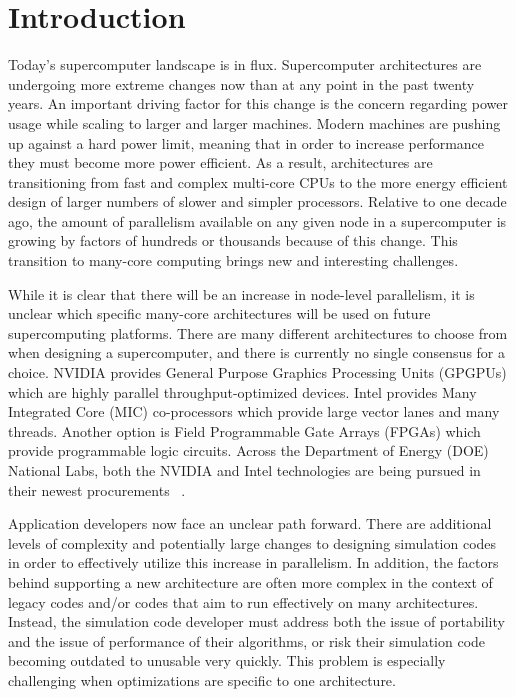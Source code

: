 \section{ \textbf{Introduction}}

Today's supercomputer landscape is in flux.
%
Supercomputer architectures are undergoing more extreme changes now than at any point in the past twenty years.
%
An important driving factor for this change is the concern regarding power usage while scaling to larger and larger machines.
%
Modern machines are pushing up against a hard power limit, meaning that in order to increase performance they must become more power efficient.
%
As a result, architectures are transitioning from fast and complex multi-core CPUs to the more energy efficient design of larger numbers of slower and simpler processors.
%
Relative to one decade ago, the amount of parallelism available on any given node in a supercomputer is growing by factors of hundreds or thousands because of this change.
%
This transition to many-core computing brings new and interesting challenges.
%

%
While it is clear that there will be an increase in node-level parallelism, it is unclear which specific many-core architectures will be used on future supercomputing platforms.
%
There are many different architectures to choose from when designing a supercomputer, and there is currently no single consensus for a choice.
%
NVIDIA provides General Purpose Graphics Processing Units (GPGPUs) which are highly parallel throughput-optimized devices.
%
Intel provides Many Integrated Core (MIC) co-processors which provide large vector lanes and many threads.
%
Another option is Field Programmable Gate Arrays (FPGAs) which provide programmable logic circuits.
%
Across the Department of Energy (DOE) National Labs, both the NVIDIA and Intel technologies are being pursued in their newest procurements ~\cite{coralWeb, trinityWeb}.
%

Application developers now face an unclear path forward.
%
There are additional levels of complexity and potentially large changes to designing simulation codes in order to effectively utilize this increase in parallelism.
%
In addition, the factors behind supporting a new architecture are often more complex in the context of legacy codes and/or codes that aim to run effectively on many architectures.
%
Instead, the simulation code developer must address both the issue of portability and the issue of performance of their algorithms, or risk their simulation code becoming outdated to unusable very quickly.
%
This problem is especially challenging when optimizations are specific to one architecture.
%


